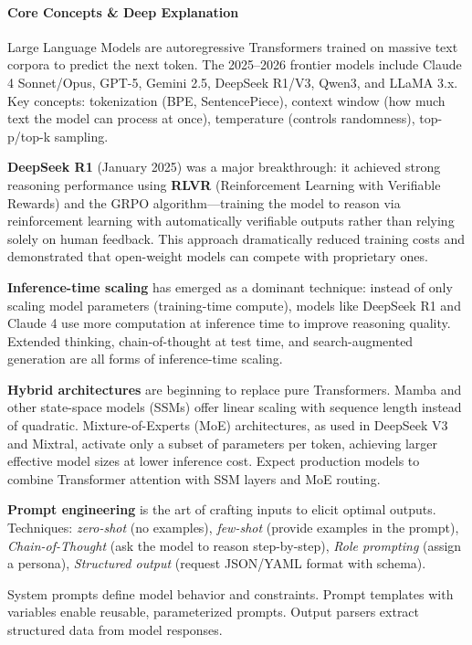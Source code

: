 \documentclass[11pt, a4paper, oneside]{report}
\begin{document}
\paragraph{Core Concepts \& Deep Explanation} Large Language Models are autoregressive Transformers trained on massive text corpora to predict the next token. The 2025--2026 frontier models include Claude 4 Sonnet/Opus, GPT-5, Gemini 2.5, DeepSeek R1/V3, Qwen3, and LLaMA 3.x. Key concepts: tokenization (BPE, SentencePiece), context window (how much text the model can process at once), temperature (controls randomness), top-p/top-k sampling.

\textbf{DeepSeek R1} (January 2025) was a major breakthrough: it achieved strong reasoning performance using \textbf{RLVR} (Reinforcement Learning with Verifiable Rewards) and the GRPO algorithm---training the model to reason via reinforcement learning with automatically verifiable outputs rather than relying solely on human feedback. This approach dramatically reduced training costs and demonstrated that open-weight models can compete with proprietary ones.

\textbf{Inference-time scaling} has emerged as a dominant technique: instead of only scaling model parameters (training-time compute), models like DeepSeek R1 and Claude 4 use more computation at inference time to improve reasoning quality. Extended thinking, chain-of-thought at test time, and search-augmented generation are all forms of inference-time scaling.

\textbf{Hybrid architectures} are beginning to replace pure Transformers. Mamba and other state-space models (SSMs) offer linear scaling with sequence length instead of quadratic. Mixture-of-Experts (MoE) architectures, as used in DeepSeek V3 and Mixtral, activate only a subset of parameters per token, achieving larger effective model sizes at lower inference cost. Expect production models to combine Transformer attention with SSM layers and MoE routing.

\textbf{Prompt engineering} is the art of crafting inputs to elicit optimal outputs. Techniques: \emph{zero-shot} (no examples), \emph{few-shot} (provide examples in the prompt), \emph{Chain-of-Thought} (ask the model to reason step-by-step), \emph{Role prompting} (assign a persona), \emph{Structured output} (request JSON/YAML format with schema).

System prompts define model behavior and constraints. Prompt templates with variables enable reusable, parameterized prompts. Output parsers extract structured data from model responses.
\end{document}
